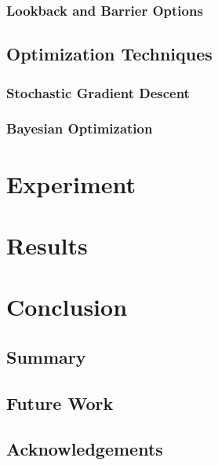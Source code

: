 \documentclass[a4paper]{report}
\begin{document}
\subsection{Lookback and Barrier Options}

\section{Optimization Techniques}

\subsection{Stochastic Gradient Descent}

\subsection{Bayesian Optimization}

\chapter{Experiment}


\chapter{Results}

\chapter{Conclusion}
\section{Summary}

\section{Future Work}

\section{Acknowledgements}
\end{document}
